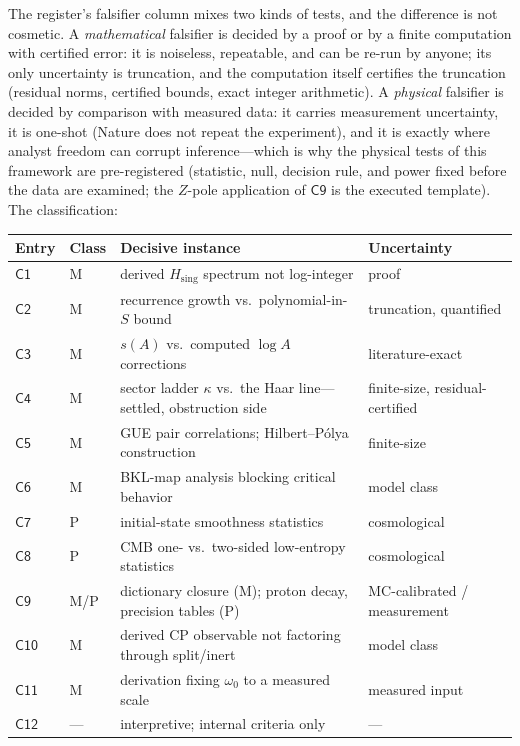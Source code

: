 The register's falsifier column mixes two kinds of tests, and the difference is not
cosmetic. A \emph{mathematical} falsifier is decided by a proof or by a finite computation
with certified error: it is noiseless, repeatable, and can be re-run by anyone; its only
uncertainty is truncation, and the computation itself certifies the truncation (residual
norms, certified bounds, exact integer arithmetic). A \emph{physical} falsifier is decided
by comparison with measured data: it carries measurement uncertainty, it is one-shot
(Nature does not repeat the experiment), and it is exactly where analyst freedom can
corrupt inference---which is why the physical tests of this framework are
pre-registered (statistic, null, decision rule, and power fixed before the data are
examined; the $Z$-pole application of $\mathsf{C9}$ is the executed template). The
classification:

\begin{center}
\small
\begin{tabular}{@{}llp{}l@{}}
\toprule
\textbf{Entry} & \textbf{Class} & \textbf{Decisive instance} & \textbf{Uncertainty}\\
\midrule
$\mathsf{C1}$ & M & derived $H_{\mathrm{sing}}$ spectrum not log-integer & proof\\
$\mathsf{C2}$ & M & recurrence growth vs.\ polynomial-in-$S$ bound & truncation, quantified\\
$\mathsf{C3}$ & M & $s(A)$ vs.\ computed $\log A$ corrections & literature-exact\\
$\mathsf{C4}$ & M & sector ladder $\kappa$ vs.\ the Haar line---settled, obstruction side & finite-size, residual-certified\\
$\mathsf{C5}$ & M & GUE pair correlations; Hilbert--P\'olya construction & finite-size\\
$\mathsf{C6}$ & M & BKL-map analysis blocking critical behavior & model class\\
$\mathsf{C7}$ & P & initial-state smoothness statistics & cosmological\\
$\mathsf{C8}$ & P & CMB one- vs.\ two-sided low-entropy statistics & cosmological\\
$\mathsf{C9}$ & M/P & dictionary closure (M); proton decay, precision tables (P) & MC-calibrated / measurement\\
$\mathsf{C10}$ & M & derived CP observable not factoring through split/inert & model class\\
$\mathsf{C11}$ & M & derivation fixing $\omega_{0}$ to a measured scale & measured input\\
$\mathsf{C12}$ & --- & interpretive; internal criteria only & ---\\
\bottomrule
\end{tabular}
\end{center}

